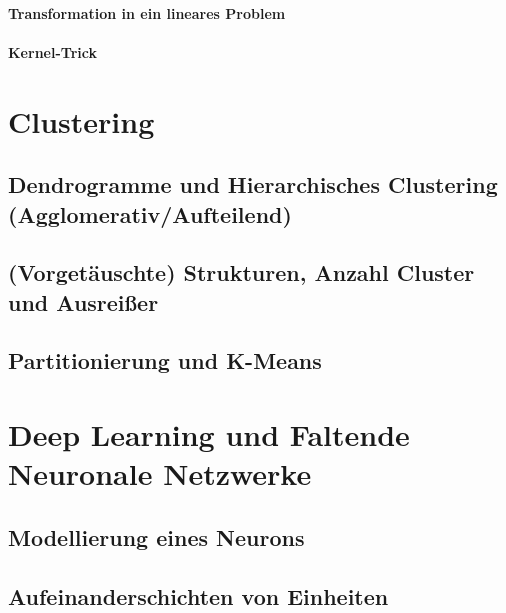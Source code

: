 			\subsubsection{Transformation in ein lineares Problem} %

			\subsubsection{Kernel-Trick} %

\chapter{Clustering} %

	\section{Dendrogramme und Hierarchisches Clustering (Agglomerativ/Aufteilend)} %

	\section{(Vorgetäuschte) Strukturen, Anzahl Cluster und Ausreißer} %

	\section{Partitionierung und K-Means} %

\chapter{Deep Learning und Faltende Neuronale Netzwerke} %
	\label{c:deepLearning}


	\section{Modellierung eines Neurons} %

	\section{Aufeinanderschichten von Einheiten} %

